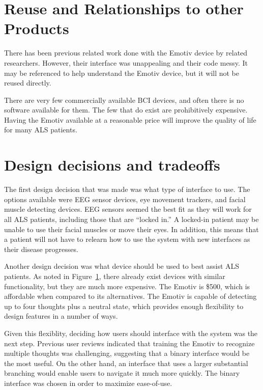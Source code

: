 \documentclass{article}
\begin{document}
\newpage

\section{Reuse and Relationships to other Products}
\label{sec:ReuseRel}

There has been previous related work done with the Emotiv device by related
researchers. However, their interface was unappealing and their code messy. It
may be referenced to help understand the Emotiv device, but it will not be
reused directly.

There are very few commercially available BCI devices, and often there is no
software available for them. The few that do exist are prohibitively
expensive. Having the Emotiv available at a reasonable price will improve the
quality of life for many ALS patients.

\section{Design decisions and tradeoffs}

The first design decision that was made was what type of interface to use.
The options available were EEG sensor devices, eye movement trackers, and
facial muscle detecting devices. EEG sensors seemed the best fit as they
will work for all ALS patients, including those that are ``locked in.'' A
locked-in patient may be unable to use their facial muscles or move their
eyes. In addition, this means that a patient will not have to relearn how to
use the system with new interfaces as their disease progresses.

Another design decision was what device should be used to best assist ALS
patients. As noted in Figure~\ref{sec:ReuseRel}, there already exist devices with
similar functionality, but they are much more expensive. The Emotiv is \$500,
which is affordable when compared to its alternatives. The Emotiv is capable
of detecting up to four thoughts plus a neutral state, which provides enough
flexibility to design features in a number of ways.

Given this flexiblity, deciding how users should interface with the system was
the next step. Previous user reviews indicated that training the Emotiv to
recognize multiple thoughts was challenging, suggesting that a binary
interface would be the most useful. On the other hand, an interface that uses
a larger substantial branching would enable users to navigate it much more
quickly. The binary interface was chosen in order to maximize ease-of-use.
\end{document}
